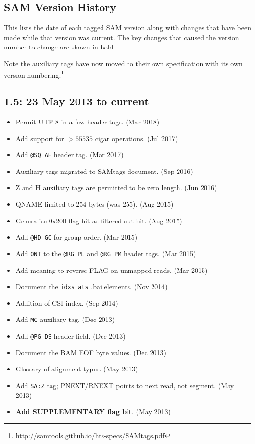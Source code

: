 \documentclass[10pt]{article}
\begin{document}
\begin{appendices}
\appendix
\section{SAM Version History}\label{sec:history}

This lists the date of each tagged SAM version along with changes that
have been made while that version was current.  The key changes
that caused the version number to change are shown in bold.

Note the auxiliary tags have now moved to their own
specification with its own version numbering.\footnote{
\href{http://samtools.github.io/hts-specs/SAMtags.pdf}{http://samtools.github.io/hts-specs/SAMtags.pdf}}

\subsection*{1.5: 23 May 2013 to current}

\begin{itemize}
\item Permit UTF-8 in a few header tags. (Mar 2018)
\item Add support for $>65535$ cigar operations. (Jul 2017)
\item Add {\tt @SQ AH} header tag. (Mar 2017)
\item Auxiliary tags migrated to SAMtags document. (Sep 2016)
\item Z and H auxiliary tags are permitted to be zero length. (Jun 2016)
\item QNAME limited to 254 bytes (was 255). (Aug 2015)
\item Generalise 0x200 flag bit as filtered-out bit. (Aug 2015)
\item Add {\tt @HD GO} for group order. (Mar 2015)
\item Add {\tt ONT} to the {\tt @RG PL} and {\tt @RG PM} header tags. (Mar 2015)
\item Add meaning to reverse FLAG on unmapped reads. (Mar 2015)
\item Document the {\tt idxstats} .bai elements. (Nov 2014)
\item Addition of CSI index. (Sep 2014)
\item Add {\tt MC} auxiliary tag. (Dec 2013)
\item Add {\tt @PG DS} header field. (Dec 2013)
\item Document the BAM EOF byte values. (Dec 2013)
\item Glossary of alignment types. (May 2013)
\item Add {\tt SA:Z} tag; PNEXT/RNEXT points to next read, not
  segment.  (May 2013)
\item \textbf{Add SUPPLEMENTARY flag bit}. (May 2013)
\end{itemize}


\end{appendices}
\end{document}
